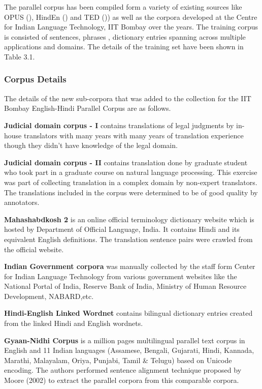 The parallel corpus has been compiled form a variety of existing sources like OPUS (\cite{TIEDEMANN12.463}), HindEn (\cite{11858/00-097C-0000-0023-625F-0}) and TED (\cite{Abdelali2014TheAC})) as well as the corpora developed at the Centre for Indian Language Technology, IIT Bombay over the years. The training corpus is consisted of sentences, phrases , dictionary entries spanning across multiple applications and domains. The details of the training set have been shown in Table 3.1.

\subsubsection{Corpus Details}
The details of the new sub-corpora that was added to the collection for the IIT Bombay English-Hindi Parallel Corpus are as follows.

\textbf{Judicial domain corpus - I} contains translations of legal judgments by in-house translators with many years with many years of translation experience though they didn’t have knowledge of the legal domain.

\textbf{Judicial domain corpus - II} contains translation done by graduate student who took part in a graduate course on natural language processing. This exercise was part of collecting translation in a complex domain by non-expert translators. The translations included in the corpus were determined to be of good quality by annotators.

\textbf{Mahashabdkosh 2} is an online official terminology dictionary website which is hosted by Department of Official Language, India. It contains Hindi and its equivalent English definitions. The translation sentence pairs were crawled from the official website.

\textbf{Indian Government corpora} was manually collected by the staff form Center for Indian Language Technology from various government websites like the National Portal of India, Reserve Bank of India, Ministry of Human Resource Development, NABARD,etc.

\textbf{Hindi-English Linked Wordnet} contains bilingual dictionary entries created from the linked Hindi and English wordnets.

\textbf{Gyaan-Nidhi Corpus} is a million pages multilingual parallel text corpus in English and 11 Indian languages (Assamese, Bengali, Gujarati, Hindi, Kannada, Marathi, Malayalam, Oriya, Punjabi, Tamil \& Telugu) based on Unicode encoding. The authors performed sentence alignment technique proposed by Moore (2002) to extract the parallel corpora from this comparable corpora. 


